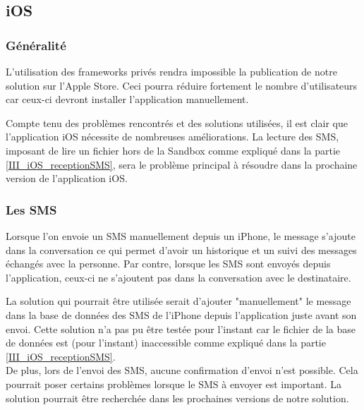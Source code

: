 \subsection{iOS}


\subsubsection{Généralité}

L'utilisation des frameworks privés rendra impossible la publication de notre solution sur l'Apple Store.
Ceci pourra réduire fortement le nombre d'utilisateurs car ceux-ci devront installer l'application manuellement. 

Compte tenu des problèmes rencontrés et des solutions utilisées, il est clair que l'application iOS nécessite de nombreuses améliorations.
La lecture des SMS, imposant de lire un fichier hors de la Sandbox comme expliqué dans la partie \ref{III_iOS_receptionSMS}, sera le problème principal à résoudre dans la prochaine version de l'application iOS.


\subsubsection{Les SMS}

Lorsque l'on envoie un SMS manuellement depuis un iPhone, le message s'ajoute dans la conversation ce qui permet d'avoir un historique et un suivi des messages échangés avec la personne.
Par contre, lorsque les SMS sont envoyés depuis l'application, ceux-ci ne s'ajoutent pas dans la conversation avec le destinataire.

La solution qui pourrait être utilisée serait d'ajouter "manuellement" le message dans la base de données des SMS de l'iPhone depuis l'application juste avant son envoi.
Cette solution n'a pas pu être testée pour l'instant car le fichier de la base de données est (pour l'instant) inaccessible comme expliqué dans la partie \ref{III_iOS_receptionSMS}.
\\


De plus, lors de l'envoi des SMS, aucune confirmation d'envoi n'est possible.
Cela pourrait poser certains problèmes lorsque le SMS à envoyer est important.
La solution pourrait être recherchée dans les prochaines versions de notre solution.





